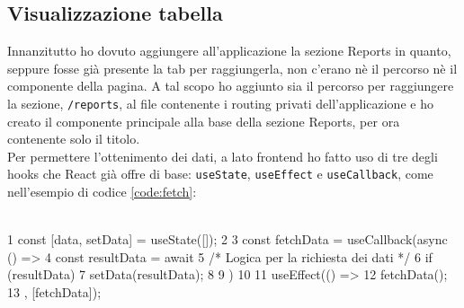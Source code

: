 \subsection{Visualizzazione tabella}
\noindent Innanzitutto ho dovuto aggiungere all'applicazione la sezione Reports in quanto, seppure fosse già presente la tab per raggiungerla, non c'erano nè il percorso nè il componente della pagina.
A tal scopo ho aggiunto sia il percorso per raggiungere la sezione, \texttt{/reports}, al file contenente i routing privati dell'applicazione e ho creato il componente principale alla base della sezione Reports, per ora contenente solo il titolo.\\
Per permettere l'ottenimento dei dati, a lato frontend ho fatto uso di tre degli hooks che React già offre di base: \texttt{useState}, \texttt{useEffect} e \texttt{useCallback}, come nell'esempio di codice \ref{code:fetch}: \\
\begin{code}[frame=tb,label={code:fetch}, caption={Esempio di fetch dati da backend e memorizzazione in React state}]\\
1   const [data, setData] = useState([]);
2 
3   const fetchData = useCallback(async () => {
4     const resultData = await
5     /* Logica per la richiesta dei dati */
6     if (resultData) {
7       setData(resultData);
8     }
9    })
10
11  useEffect(() => {
12    fetchData();
13  }, [fetchData]);
\end{code}\\\\

